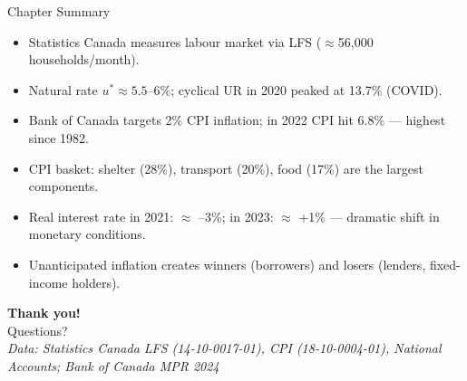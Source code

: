 \documentclass[aspectratio=169]{beamer}
\begin{document}
\begin{frame}{Chapter Summary}
\transfade
\begin{itemize}[<+->]
  \item Statistics Canada measures labour market via LFS ($\approx$56,000 households/month).
  \item Natural rate $u^* \approx 5.5$--$6\%$; cyclical UR in 2020 peaked at 13.7\% (COVID).
  \item Bank of Canada targets 2\% CPI inflation; in 2022 CPI hit 6.8\% --- highest since 1982.
  \item CPI basket: shelter (28\%), transport (20\%), food (17\%) are the largest components.
  \item Real interest rate in 2021: $\approx$ --3\%; in 2023: $\approx$ +1\% --- dramatic shift in monetary conditions.
  \item Unanticipated inflation creates winners (borrowers) and losers (lenders, fixed-income holders).
\end{itemize}
\end{frame}

\begin{frame}
\centering
\Huge \textbf{Thank you!}\\[1em]
\normalsize Questions?\\[0.5em]
\small\itshape Data: Statistics Canada LFS (14-10-0017-01), CPI (18-10-0004-01), National Accounts; Bank of Canada MPR 2024
\end{frame}
\end{document}
